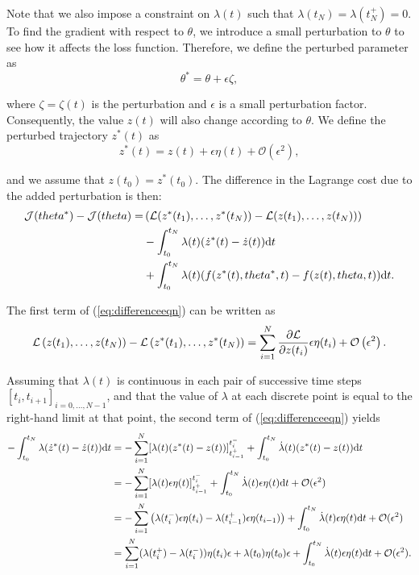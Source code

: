 \documentclass[a4paper,11pt,titlepage]{article}
\theoremstyle{definition}
\theoremstyle{plain}
\theoremstyle{remark}
\begin{document}
Note that we also impose a constraint on $\lambda(t)$ such that $\lambda(t_N)=\lambda(t_N^+)=0$. To find the gradient with respect to $\theta$, we introduce a small perturbation to $\theta$ to see how it affects the loss function. Therefore, we define the perturbed parameter as
$$
\theta^*=\theta+\epsilon\zeta,
$$

where $\zeta=\zeta(t)$ is the perturbation and $\epsilon$ is a small perturbation factor. Consequently, the value $z(t)$ will also change according to $\theta$. We define the perturbed trajectory $z^*(t)$ as 
$$z^*(t)=z(t)+\epsilon\eta(t)+\mathcal{O}(\epsilon^2),$$

and we assume that $z(t_0)=z^*(t_0)$. The difference in the Lagrange cost due to the added perturbation is then:
\begin{align}
\mathcal{J}(\theta^*)-\mathcal{J}(\theta)=&\left(\mathcal{L}(z^*(t_1),\dots,z^*(t_{N}))-\mathcal{L}(z(t_1),\dots,z(t_{N}))\right)\notag\\
&-\int^{t_N}_{t_0}\lambda(t)(\dot{z}^*(t)-\dot{z}(t))\mathrm{d}t\notag\\
&+\int^{t_N}_{t_0}\lambda(t)(f(z^*(t),\theta^*,t)-f(z(t),\theta,t))\mathrm{d}t.
\label{eq:differenceeqn}
\end{align}

The first term of (\ref{eq:differenceeqn}) can be written as
$$
\mathcal{L}\left(z(t_1),\dots,z(t_{N})\right)-\mathcal{L}\left(z^*(t_1),\dots,z^*(t_{N})\right) = \sum^N_{i=1}\frac{\partial \mathcal{L}}{\partial z(t_i)}\epsilon\eta(t_i)+\mathcal{O}\left(\epsilon^2\right).\notag
$$

Assuming that $\lambda(t)$ is continuous in each pair of successive time steps $[t_i,t_{i+1}]_{i=0,\dots,N-1}$, and that the value of $\lambda$ at each discrete point is equal to the right-hand limit at that point, the second term of (\ref{eq:differenceeqn}) yields 
\begin{align}
-\int^{t_N}_{t_0}\lambda(\dot{z}^*(t)-\dot{z}(t))\mathrm{d}t&=-\sum^{N}_{i=1}[\lambda(t)(z^*(t)-z(t))]_{t_{i-1}^+}^{t_{i}^-}+\int^{t_N}_{t_0}\dot{\lambda}(t)(z^*(t)-z(t))\mathrm{d}t\notag\\
&=-\sum^{N}_{i=1}[\lambda(t)\epsilon\eta(t)]_{t_{i-1}^+}^{t_{i}^-}+\int^{t_N}_{t_0}\dot{\lambda}(t)\epsilon\eta(t)\mathrm{d}t+\mathcal{O}(\epsilon^2)\notag\\
&=-\sum^{N}_{i=1}\left(\lambda(t_i^-)\epsilon\eta(t_i)-\lambda(t_{i-1}^+)\epsilon\eta(t_{i-1})\right)+\int^{t_N}_{t_0}\dot{\lambda}(t)\epsilon\eta(t)\mathrm{d}t+\mathcal{O}(\epsilon^2)\notag\\
&=\sum^{N}_{i=1} (\lambda(t_i^+)-\lambda(t_i^-))\eta(t_i)\epsilon+\lambda(t_0)\eta(t_0)\epsilon+\int^{t_N}_{t_0}\dot{\lambda}(t)\epsilon\eta(t)\mathrm{d}t+\mathcal{O}(\epsilon^2).\notag
\end{align}
\end{document}
